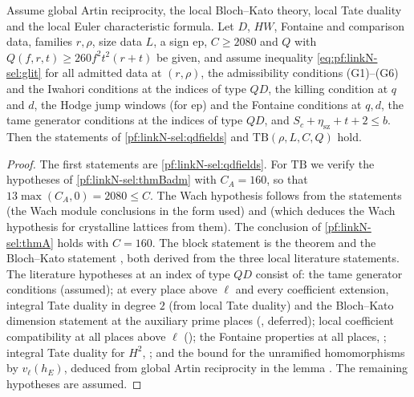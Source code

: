 \begin{theorem}\label{pf:linkN-sel:tpb}
Assume global Artin reciprocity, the local Bloch--Kato theory, local Tate duality and the local Euler characteristic formula. Let $D$, $HW$,
Fontaine and comparison data, families $r,\rho$, size data $L$, a sign $\mathrm{ep}$, $C\ge2080$ and $Q$ with $Q(f,r,t)\ge260f^2t^2(r+t)$ be
given, and assume inequality \eqref{eq:pf:linkN-sel:glit} for all admitted data at $(r,\rho)$, the admissibility conditions (G1)--(G6) and
the Iwahori conditions at the indices of type $QD$, the killing condition at $q$ and $d$, the Hodge jump windows (for $\mathrm{ep}$) and the
Fontaine conditions at $q,d$, the tame generator conditions at the indices of type $QD$, and $S_c+\eta_{\mathrm{sz}}+t+2\le b$. Then the
statements of \cref{pf:linkN-sel:qdfields} and $\mathrm{TB}(\rho,L,C,Q)$ hold.
\end{theorem}

\begin{proof}
The first statements are \cref{pf:linkN-sel:qdfields}. For $\mathrm{TB}$ we verify the hypotheses of \cref{pf:linkN-sel:thmBadm} with
$C_A=160$, so that $13\max(C_A,0)=2080\le C$. The Wach hypothesis follows from the statements
 (the Wach module conclusions in the form used) and
 (which deduces the Wach hypothesis for crystalline lattices from them). The
conclusion of \cref{pf:linkN-sel:thmA} holds with $C=160$. The block statement is the theorem
 and the Bloch--Kato statement , both derived from the three local literature statements. The
literature hypotheses at an index of type $QD$ consist of: the tame generator conditions (assumed); at every place above $\ell$ and every
coefficient extension, integral Tate duality in degree $2$ (from local Tate duality) and the Bloch--Kato dimension statement at the
auxiliary prime places (, deferred); local coefficient
compatibility at all places above $\ell$ (); the Fontaine properties at all
places, ; integral Tate duality for $H^2$,
; and the bound for the unramified homomorphisms by $v_\ell(h_E)$, deduced from
global Artin reciprocity in the lemma . The remaining hypotheses are
assumed.
\end{proof}

